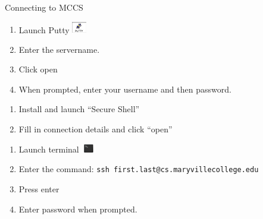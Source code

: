 \documentclass{beamer}
\begin{document}
\begin{frame}{Connecting to MCCS}


    \begin{description}[<+->]
        \item[Windows]
            \begin{enumerate}
                \item Launch Putty
                    \includegraphics[width=0.25in]{images/putty}
                \item Enter the servername.
                \item Click open
                \item When prompted, enter your username and then
                password.
            \end{enumerate}
        \hrulefill
        \item[ChromeOS]
            \begin{enumerate}
                \item Install and launch ``Secure Shell''
                \item Fill in connection details and click ``open''
            \end{enumerate}
        \hrulefill
        \item[MacOS X]
            \begin{enumerate}
                \item Launch terminal
                \includegraphics[width=0.25in]{images/macterm}
                \item Enter the command: {\tt ssh
                first.last@cs.maryvillecollege.edu}
                \item Press enter
                \item Enter password when prompted.
            \end{enumerate}
    \end{description}
\end{frame}
\end{document}
